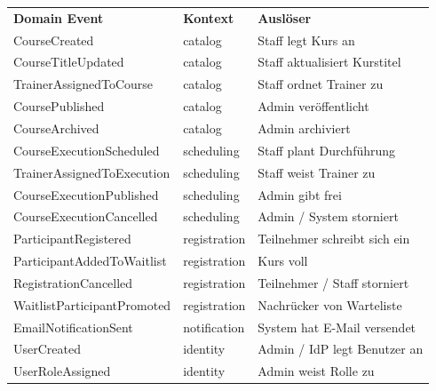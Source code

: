 \begin{tabularx}{\textwidth}{L{5cm} L{2.5cm} X}
  \color{white}\textbf{Domain Event} & \color{white}\textbf{Kontext} & \color{white}\textbf{Auslöser} \\
  CourseCreated & catalog & Staff legt Kurs an \\
  CourseTitleUpdated & catalog & Staff aktualisiert Kurstitel \\
  TrainerAssignedToCourse & catalog & Staff ordnet Trainer zu \\
  CoursePublished & catalog & Admin veröffentlicht \\
  CourseArchived & catalog & Admin archiviert \\
  CourseExecutionScheduled & scheduling & Staff plant Durchführung \\
  TrainerAssignedToExecution & scheduling & Staff weist Trainer zu \\
  CourseExecutionPublished & scheduling & Admin gibt frei \\
  CourseExecutionCancelled & scheduling & Admin / System storniert \\
  ParticipantRegistered & registration & Teilnehmer schreibt sich ein \\
  ParticipantAddedToWaitlist & registration & Kurs voll \\
  RegistrationCancelled & registration & Teilnehmer / Staff storniert \\
  WaitlistParticipantPromoted & registration & Nachrücker von Warteliste \\
  EmailNotificationSent & notification & System hat E-Mail versendet \\
  UserCreated & identity & Admin / IdP legt Benutzer an \\
  UserRoleAssigned & identity & Admin weist Rolle zu \\
\end{tabularx}
